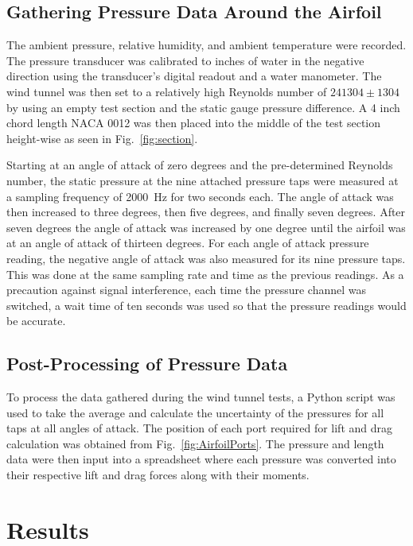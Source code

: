 \documentclass[journal,letterpaper]{IEEEtran}
\begin{document}
\subsection{Gathering Pressure Data Around the Airfoil}

The ambient pressure, relative humidity, and ambient temperature were recorded.
The pressure transducer was calibrated to inches of water in the negative direction using the transducer's digital readout and a water manometer.
The wind tunnel was then set to a relatively high Reynolds number of $241304 \pm 1304$ by using an empty test section and the static gauge pressure difference.
A 4 inch chord length NACA 0012 was then placed into the middle of the test section height-wise as seen in Fig.~\ref{fig:section}.

Starting at an angle of attack of zero degrees and the pre-determined Reynolds number, the static pressure at the nine attached pressure taps were measured at a sampling frequency of \qty{2000}{\Hz} for two seconds each.
The angle of attack was then increased to three degrees, then five degrees, and finally seven degrees.
After seven degrees the angle of attack was increased by one degree until the airfoil was at an angle of attack of thirteen degrees.
For each angle of attack pressure reading, the negative angle of attack was also measured for its nine pressure taps.
This was done at the same sampling rate and time as the previous readings.
As a precaution against signal interference, each time the pressure channel was switched, a wait time of ten seconds was used so that the pressure readings would be accurate.

\subsection{Post-Processing of Pressure Data}

To process the data gathered during the wind tunnel tests, a Python script was used to take the average and calculate the uncertainty of the pressures for all taps at all angles of attack.
The position of each port required for lift and drag calculation was obtained from Fig.~\ref{fig:AirfoilPorts}.
The pressure and length data were then input into a spreadsheet where each pressure was converted into their respective lift and drag forces along with their moments.


\section{Results}
\end{document}
